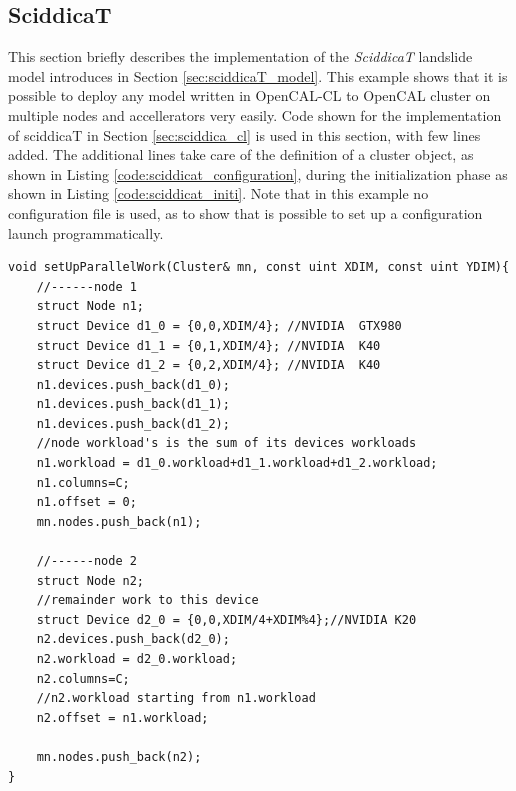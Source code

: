 \subsection{SciddicaT}
This section briefly describes the implementation of the \textit{SciddicaT} landslide model introduces in Section \ref{sec:sciddicaT_model}.
This example shows that it is possible to deploy any model written in OpenCAL-CL to OpenCAL cluster on multiple nodes and accellerators very easily. 
Code shown for the implementation of sciddicaT  in Section \ref{sec:sciddica_cl} is used in this section, with few lines added.
The additional lines take care of the definition of a cluster object, as shown in Listing \ref{code:sciddicat_configuration}, during the initialization phase as shown in Listing \ref{code:sciddicat_initi}.
Note that in this example no configuration file is used, as to show that is possible to set up a configuration launch programmatically.

\begin{lstlisting}
void setUpParallelWork(Cluster& mn, const uint XDIM, const uint YDIM){
	//------node 1
	struct Node n1;
	struct Device d1_0 = {0,0,XDIM/4}; //NVIDIA  GTX980
	struct Device d1_1 = {0,1,XDIM/4}; //NVIDIA  K40
	struct Device d1_2 = {0,2,XDIM/4}; //NVIDIA  K40	
	n1.devices.push_back(d1_0);
	n1.devices.push_back(d1_1);
	n1.devices.push_back(d1_2);
	//node workload's is the sum of its devices workloads
	n1.workload = d1_0.workload+d1_1.workload+d1_2.workload;
	n1.columns=C;
	n1.offset = 0;
	mn.nodes.push_back(n1);
	
	//------node 2
	struct Node n2;
	//remainder work to this device
	struct Device d2_0 = {0,0,XDIM/4+XDIM%4};//NVIDIA K20
	n2.devices.push_back(d2_0);
	n2.workload = d2_0.workload;
	n2.columns=C;
	//n2.workload starting from n1.workload
	n2.offset = n1.workload;
	
	mn.nodes.push_back(n2);
}
\end{lstlisting}


